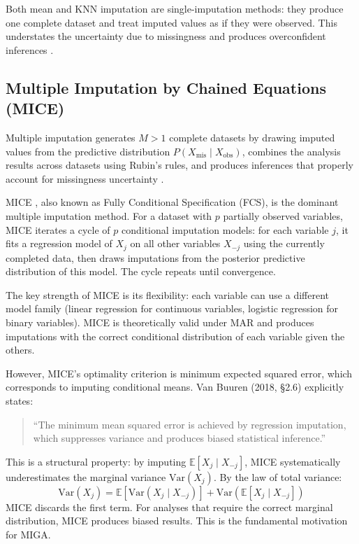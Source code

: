 Both mean and KNN imputation are single-imputation methods: they produce one complete dataset and treat imputed values as if they were observed. This understates the uncertainty due to missingness and produces overconfident inferences \cite{Rubin1987}.

\subsection{Multiple Imputation by Chained Equations (MICE)}

Multiple imputation generates $M > 1$ complete datasets by drawing imputed values from the predictive distribution $P(X_{\text{mis}} \mid X_{\text{obs}})$, combines the analysis results across datasets using Rubin's rules, and produces inferences that properly account for missingness uncertainty \cite{Rubin1987}.

MICE \cite{vanBuuren2011}, also known as Fully Conditional Specification (FCS), is the dominant multiple imputation method. For a dataset with $p$ partially observed variables, MICE iterates a cycle of $p$ conditional imputation models: for each variable $j$, it fits a regression model of $X_j$ on all other variables $X_{-j}$ using the currently completed data, then draws imputations from the posterior predictive distribution of this model. The cycle repeats until convergence.

The key strength of MICE is its flexibility: each variable can use a different model family (linear regression for continuous variables, logistic regression for binary variables). MICE is theoretically valid under MAR and produces imputations with the correct conditional distribution of each variable given the others.

However, MICE's optimality criterion is minimum expected squared error, which corresponds to imputing conditional means. Van Buuren (2018, \S2.6) explicitly states:

\begin{quotation}
``The minimum mean squared error is achieved by regression imputation, which suppresses variance and produces biased statistical inference.''
\end{quotation}

This is a structural property: by imputing $\mathbb{E}[X_j \mid X_{-j}]$, MICE systematically underestimates the marginal variance $\text{Var}(X_j)$. By the law of total variance:
\begin{equation}
    \text{Var}(X_j) = \mathbb{E}[\text{Var}(X_j \mid X_{-j})] + \text{Var}(\mathbb{E}[X_j \mid X_{-j}])
\end{equation}
MICE discards the first term. For analyses that require the correct marginal distribution, MICE produces biased results. This is the fundamental motivation for MIGA.

